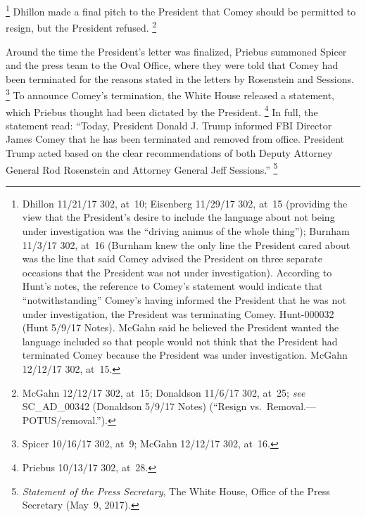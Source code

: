\footnote{Dhillon 11/21/17 302, at~10;
Eisenberg 11/29/17 302, at~15 (providing the view that the President's desire to include the language about not being under investigation was the ``driving animus of the whole thing'');
Burnham 11/3/17 302, at~16 (Burnham knew the only line the President cared about was the line that said Comey advised the President on three separate occasions that the President was not under investigation).
According to Hunt's notes, the reference to Comey's statement would indicate that ``notwithstanding'' Comey's having informed the President that he was not under investigation, the President was terminating Comey.
Hunt-000032 (Hunt 5/9/17 Notes).
McGahn said he believed the President wanted the language included so that people would not think that the President had terminated Comey because the President was under investigation.
McGahn 12/12/17 302, at~15.}
Dhillon made a final pitch to the President that Comey should be permitted to resign, but the President refused.%
\footnote{McGahn 12/12/17 302, at~15;
Donaldson 11/6/17 302, at~25;
\textit{see} SC\_AD\_00342 (Donaldson 5/9/17 Notes) (``Resign vs.\ Removal.---POTUS/removal.'').}

Around the time the President's letter was finalized, Priebus summoned Spicer and the press team to the Oval Office, where they were told that Comey had been terminated for the reasons stated in the letters by Rosenstein and Sessions.%
\footnote{Spicer 10/16/17 302, at~9;
McGahn 12/12/17 302, at~16.}
To announce Comey's termination, the White House released a statement, which Priebus thought had been dictated by the President.%
\footnote{Priebus 10/13/17 302, at~28.}
In full, the statement read: ``Today, President Donald J. Trump informed FBI Director James Comey that he has been terminated and removed from office.
President Trump acted based on the clear recommendations of both Deputy Attorney General Rod Rosenstein and Attorney General Jeff Sessions.''%
\footnote{\textit{Statement of the Press Secretary}, The White House, Office of the Press Secretary (May~9, 2017).}

